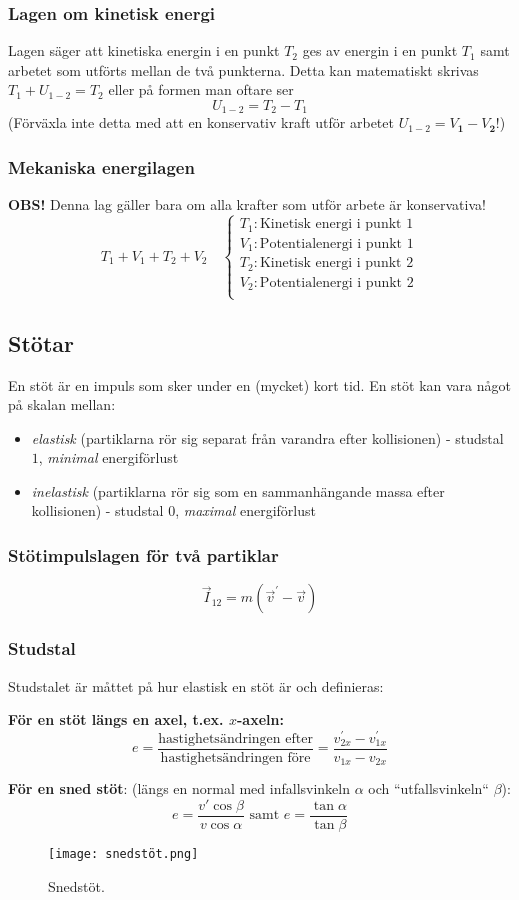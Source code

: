 \documentclass{article}
\begin{document}
\begin{paracol}{2}
\subsubsection{Lagen om kinetisk energi}
Lagen säger att kinetiska energin i en punkt $T_2$ ges av energin i en punkt $T_1$ samt arbetet som utförts mellan de två punkterna. Detta kan matematiskt skrivas $T_1 + U_{1-2} = T_2$ eller på formen man oftare ser
$$
U_{1-2} = T_2 - T_1
$$
(Förväxla inte detta med att en konservativ kraft utför arbetet $U_{1-2}=V_{\mathbf 1}-V_{\mathbf 2}$!)
\subsubsection{Mekaniska energilagen}
\textbf{OBS!} Denna lag gäller bara om alla krafter som utför arbete är konservativa!
$$
T_1 + V_1 + T_2 + V_2\quad\left\{\begin{array}{l}T_1: \text{Kinetisk energi i punkt 1} \\V_1: \text{Potentialenergi i punkt 1} \\T_2: \text{Kinetisk energi i punkt 2} \\V_2: \text{Potentialenergi i punkt 2} \\\end{array}\right.$$
\subsection{Stötar}
En stöt är en impuls som sker under en (mycket) kort tid. En stöt kan vara något på skalan mellan:
\begin{itemize}
    \item \textit{elastisk} (partiklarna rör sig separat från varandra efter kollisionen) - studstal $1$, \color{blue}\textit{minimal }\color{black} energiförlust
    \item  \textit{inelastisk } (partiklarna rör sig som en sammanhängande massa efter kollisionen) - studstal $0$, \color{red}\textit{maximal }\color{black} energiförlust
\end{itemize}
\subsubsection{Stötimpulslagen för två partiklar}
$$\vec I_{12} = m(\vec v^{\prime} - \vec v)$$
\subsubsection{Studstal}
Studstalet är måttet på hur elastisk en stöt är och definieras:


\textbf{För en stöt längs en axel, t.ex. $x$-axeln:}
$$
e=\frac{\text{hastighetsändringen efter}}{\text{hastighetsändringen före}}=\frac{v_{2x}^{\prime}-{v_{1x}^{\prime}}}{v_{1x}-v_{2x}}
$$


\textbf{För en sned stöt}:
(längs en normal med infallsvinkeln $\alpha$ och ``utfallsvinkeln`` $\beta$):
$$
e=\frac{v'\cos\beta}{v\cos\alpha}\text{ samt } e =\frac{\tan \alpha}{\tan \beta}
$$
\begin{figure}[H]
    \centering
\texttt{[image: snedstöt.png]}
    \caption{Snedstöt.}
\end{figure}

\end{paracol}
\end{document}
